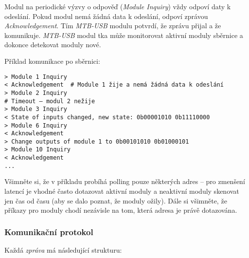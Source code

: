 Modul na periodické výzvy o odpověď (\textit{Module Inquiry}) vždy odpoví daty
k odeslání. Pokud modul nemá žádná data k odeslání, odpoví zprávou
\textit{Acknowledgement}. Tím \textit{MTB-USB} modulu potvrdí, že zprávu přijal
a že komunikuje. \textit{MTB-USB} modul tka může monitorovat aktivní moduly
sběrnice a dokonce detekovat moduly nové.

Příklad komunikace po sběrnici:

\begin{verbatim}
> Module 1 Inquiry
< Acknowledgement  # Module 1 žije a nemá žádná data k odeslání
> Module 2 Inquiry
# Timeout – modul 2 nežije
> Module 3 Inquiry
< State of inputs changed, new state: 0b00001010 0b11110000
> Module 6 Inquiry
< Acknowledgement
> Change outputs of module 1 to 0b00101010 0b01000101
> Module 10 Inquiry
< Acknowledgement
...
\end{verbatim}

Všimněte si, že v příkladu probíhá polling pouze některých adres – pro zmenšení
latencí je vhodné často dotazovat aktivní moduly a neaktivní moduly skenovat
jen čas od času (aby se dalo poznat, že moduly ožily). Dále si všimněte, že
příkazy pro moduly chodí nezávisle na tom, která adresa je právě dotazována.

\subsubsection{Komunikační protokol}

Každá \textit{zpráva} má následující strukturu:

